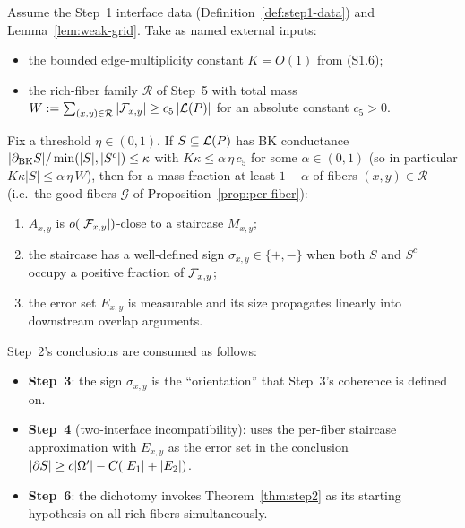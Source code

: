 \begin{theorem}\label{thm:step2}
Assume the Step~1 interface data (Definition~\ref{def:step1-data}) and
Lemma~\ref{lem:weak-grid}. Take as named external inputs:
\begin{itemize}[nosep]
  \item the bounded edge-multiplicity constant $K=O(1)$ from (S1.6);
  \item the rich-fiber family $\mathcal{R}$ of Step~5 with total mass
        $W:=\sum_{(x,y)\in\mathcal{R}}|\mathcal{F}_{x,y}|\ge c_5\,|\mathcal{L}(P)|$ for an
        absolute constant $c_5>0$.
\end{itemize}
Fix a threshold $\eta\in(0,1)$. If $S\subseteq\mathcal{L}(P)$ has BK conductance
$|\partial_{\mathrm{BK}} S| / \min(|S|,|S^c|) \le \kappa$ with $K\kappa\le\alpha\,\eta\,c_5$
for some $\alpha\in(0,1)$ (so in particular $K\kappa|S|\le\alpha\,\eta\,W$), then
for a mass-fraction at least $1-\alpha$ of fibers $(x,y)\in\mathcal{R}$ (i.e.\
the good fibers $\mathcal{G}$ of Proposition~\ref{prop:per-fiber}):
\begin{enumerate}[nosep]
    \item $A_{x,y}$ is $o(|\mathcal{F}_{x,y}|)$-close to a staircase $M_{x,y}$;
    \item the staircase has a well-defined sign $\sigma_{x,y}\in\{+,-\}$ when both $S$
          and $S^c$ occupy a positive fraction of $\mathcal{F}_{x,y}$;
    \item the error set $E_{x,y}$ is measurable and its size propagates linearly into
          downstream overlap arguments.
\end{enumerate}
\end{theorem}

\begin{remark}[Consumers]
Step~2's conclusions are consumed as follows:
\begin{itemize}[nosep]
    \item \textbf{Step~3}: the sign $\sigma_{x,y}$ is the ``orientation'' that Step~3's
          coherence is defined on.
    \item \textbf{Step~4} (two-interface incompatibility): uses the per-fiber staircase
          approximation with $E_{x,y}$ as the error set in the conclusion
          $|\partial S| \ge c|\Omega'| - C(|E_1|+|E_2|)$.
    \item \textbf{Step~6}: the dichotomy invokes Theorem~\ref{thm:step2} as its starting
          hypothesis on all rich fibers simultaneously.
\end{itemize}
\end{remark}

